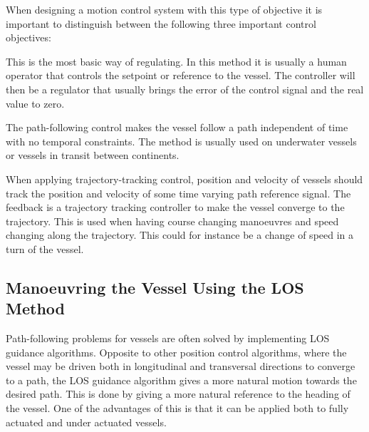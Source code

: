 When designing a motion control system with this type of objective it is important to distinguish between the following three important control objectives:
\begin{description}[style=nextline]
	\item [Setpoint Regulation]
	This is the most basic way of regulating. In this method it is usually a human operator that controls the setpoint or reference to the vessel. The controller will then be a regulator that usually brings the error of the control signal and the real value to zero.
	\item [Path-Following Control]
	The path-following control makes the vessel follow a path independent of time with no temporal constraints. The method is usually used on underwater vessels or vessels in transit between continents.
	\item [Trajectory-Tracking Control]
	When applying trajectory-tracking control, position and velocity of vessels should track the position and velocity of some time varying path reference signal. The feedback is a trajectory tracking controller to make the vessel converge to the trajectory. This is used when having course changing manoeuvres and speed changing along the trajectory. This could for instance be a change of speed in a turn of the vessel.
\end{description}

\subsection{Manoeuvring the Vessel Using the LOS Method}
Path-following problems for vessels are often solved by implementing \ac{LOS} guidance algorithms. Opposite to other position control algorithms, where the vessel may be driven both in longitudinal and transversal directions to converge to a path, the \ac{LOS} guidance algorithm gives a more natural motion towards the desired path. This is done by giving a more natural reference to the heading of the vessel. One of the advantages of this is that it can be applied both to fully actuated and under actuated vessels.

